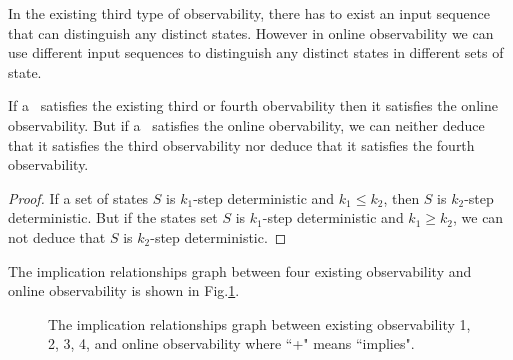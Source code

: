In the existing third type of observability, there has to exist an input sequence that can distinguish any distinct states. However in online observability we can use different input sequences to distinguish any distinct states in different sets of state. 
\begin{theorem}
If a \BCN\ satisfies the existing third or fourth obervability then it satisfies the online observability. But if a \BCN\ satisfies the online obervability, we can neither deduce that it satisfies the third observability nor deduce that it satisfies the fourth observability.
\end{theorem}
\begin{proof}
 If a set of states $S$ is $k_1$-step deterministic and $k_1\leq k_2$, then $S$ is $k_2$-step deterministic. But if the states set $S$ is $k_1$-step deterministic and $k_1\geq k_2$, we can not deduce that $S$ is $k_2$-step deterministic. 
\end{proof}

The implication relationships graph between four existing observability and online observability is shown in Fig.\ref{fig:7}.

\begin{figure}[thpb]
      \centering
      
      \caption{The implication relationships graph between existing observability 1, 2, 3, 4, and online observability where ``+" means ``implies".}
      \label{fig:7}
   \end{figure}
   
